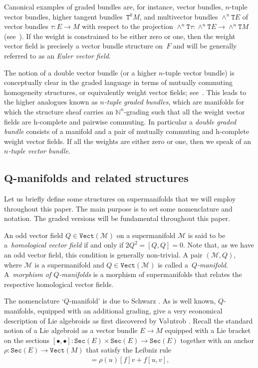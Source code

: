 \documentclass[10pt,a4paper]{amsart}
\def\Sec{\mathtt{Sec}}
\def\Vect{\mathtt{Vect}}
\def\sT{{\mathtt T}}
\numberwithin{equation}{section}
\begin{document}
Canonical examples of graded bundles are, for instance, vector bundles, $n$-tuple vector bundles, higher tangent bundles~$\sT^kM$, and multivector bundles $\wedge^n\sT E$ of vector bundles $\tau\colon E\to M$ with respect to the projection $\wedge^n\sT\tau\colon \wedge^n\sT E\to \wedge^n\sT M$ (see~\cite{Grabowska2014}).  If the weight is constrained to be either zero or one, then the weight vector f\/ield is precisely a  vector bundle structure on~$F$ and will be generally referred  to as an \emph{Euler vector field}.


The notion of a double vector bundle \cite{Pradines:1974} (or a higher $n$-tuple vector bundle)   is conceptually  clear in the graded language in terms of mutually commuting homogeneity structures, or equivalently weight vector f\/ields; see~\cite{Grabowski:2006,Grabowski2012}. This leads to the higher analogues known as \emph{$n$-tuple graded bundles}, which are  manifolds for which  the structure sheaf carries an $\mathbb{N}^{n}$-grading such that all the weight vector f\/ields are h-complete and pairwise commuting.  In particular a \emph{double graded bundle} consists of a manifold and a pair of mutually commuting and h-complete weight vector f\/ields. If all the weights are either zero or one, then we speak of an \emph{$n$-tuple vector bundle}.


\subsection[$Q$-manifolds and related structures]{$\boldsymbol{Q}$-manifolds and related structures}
Let us brief\/ly def\/ine some structures on supermanifolds that we will employ throughout this paper. The main purpose is to set some nomenclature and notation. The graded versions will be fundamental throughout this paper.

\begin{Definition}
An odd vector f\/ield $Q  \in \Vect(\mathcal{M})$ on a supermanifold $\mathcal{M}$ is said to be a~\emph{homological vector field}  if and only if $2 Q^{2} =  [Q,Q]=0$. Note that, as we have an odd vector f\/ield, this condition is generally non-trivial. A pair $(\mathcal{M},Q)$, where $\mathcal{M}$ is a supermanifold and $Q \in \Vect(\mathcal{M})$ is called a~\emph{$Q$-manifold}. A~\emph{morphism of $Q$-manifolds} is a morphism of supermanifolds that  relates the respective homological vector f\/ields.
\end{Definition}


The nomenclature `$Q$-manifold' is due to Schwarz \cite{Schwarz:1993}.  As is well known, $Q$-manifolds, equipped with an additional grading, give a very economical description of Lie algebroids as f\/irst discovered by  Va$\breve{\textrm{{\i}}}$ntrob \cite{Vaintrob:1997}. Recall the standard notion of a Lie algebroid as a vector bundle $E \rightarrow M$ equipped with a Lie bracket on the sections $[\bullet, \bullet]\colon  \Sec(E) \times \Sec(E) \rightarrow \Sec(E)$ together with an anchor $\rho\colon  \Sec(E) \rightarrow \Vect(M)$ that satisfy the Leibniz rule
\begin{gather*}
 [u,fv] = \rho(u)[f]   v  +   f [u,v],
\end{gather*}
\end{document}
